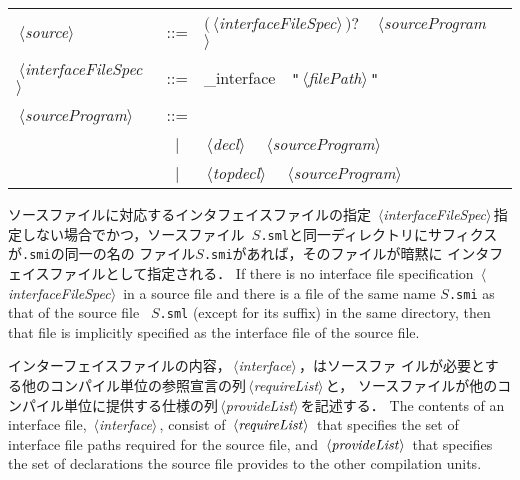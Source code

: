 \documentclass{jbook}
\newcommand{\vbar}{\mbox{\ $|$\ }}
\newcommand{\nonterm}[1]{\mbox{$\,\langle$}{\it #1}\mbox{$\rangle\,$}}
\newcommand{\term}[1]{\mbox{{\tt #1}}}
\newcommand{\optional}[1]{\mbox{$($}{\protect #1}\mbox{$)?$}}
\newcommand{\sep}{\mbox{\ \ }}
\begin{document}
\begin{center}
\begin{tabular}{lcll}
\nonterm{source} &::=& \optional{\nonterm{interfaceFileSpec}}\sep \nonterm{sourceProgram}
\\
\nonterm{interfaceFileSpec} &::=& \_interface\sep \term{"}\nonterm{filePath}\term{"}
\\
\nonterm{sourceProgram} &::=& \\
&\vbar& \nonterm{decl}\sep \nonterm{sourceProgram}\\
&\vbar& \nonterm{topdecl}\sep \nonterm{sourceProgram}\\
\end{tabular}
\end{center}


\ifjp%
	ソースファイルに対応するインタフェイスファイルの指定
\nonterm{interfaceFileSpec}指定しない場合でかつ，ソースファイル\mbox{\tt
$S$.sml}と同一ディレクトリにサフィクスが{\tt .smi}の同一の名の
ファイル\mbox{\tt $S$.smi}があれば，そのファイルが暗黙に
インタフェイスファイルとして指定される．
\else%
	If there is no interface file specification
\nonterm{interfaceFileSpec} in a source file and there is a file of the
same name \mbox{\tt $S$.smi} as that of the source file \mbox{\tt
$S$.sml} (except  for its suffix) in the same directory, then that file
is implicitly specified as the interface file of the source file.
\fi%


\ifjp%
	インターフェイスファイルの内容，\nonterm{interface}，はソースファ
イルが必要とする他のコンパイル単位の参照宣言の列\nonterm{requireList}と，
ソースファイルが他のコンパイル単位に提供する仕様の列\nonterm{provideList}を記述する．
\else%
	The contents of an interface file, \nonterm{interface}, consist of
$\nonterm{requireList}$ that specifies the set of interface file paths
required for the source file,  and $\nonterm{provideList}$ that
specifies the set of declarations the source file provides to the other
compilation units. 
\fi%
\end{document}
